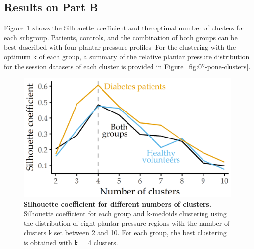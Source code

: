 \documentclass[
  oneside]{book}
\begin{document}
\hypertarget{results-on-part-b}{%
\subsection{Results on Part B}\label{results-on-part-b}}

Figure~\ref{fig:07-pone-silhouette} shows the Silhouette coefficient and the optimal number of clusters for each subgroup.
Patients, controls, and the combination of both groups can be best described with four plantar pressure profiles.
For the clustering with the optimum k of each group, a summary of the relative plantar pressure distribution for the session datasets of each cluster is provided in Figure~\ref{fig:07-pone-clusters}.



\begin{figure}[htb]

{\centering \includegraphics[width=0.5\linewidth]{figures/07-pone-silhouette} 

}

\caption{\textbf{Silhouette coefficient for different numbers of clusters.} Silhouette coefficient for each group and k-medoids clustering using the distribution of eight plantar pressure regions with the number of clusters k set between 2 and 10. For each group, the best clustering is obtained with k = 4 clusters.}\label{fig:07-pone-silhouette}
\end{figure}
\end{document}
